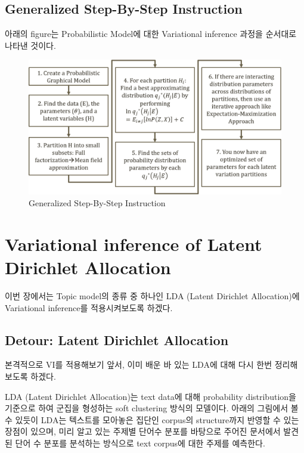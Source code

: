 \documentclass[draft=false]{oblivoir}
\begin{document}
\subsection{Generalized Step-By-Step Instruction}
아래의 figure는 Probabilistic Model에 대한 Variational inference 과정을 순서대로 나타낸 것이다. 

\begin{figure}[ht] \centering 
\includegraphics[scale=0.4]{fig11_9.png} 
\caption{Generalized Step-By-Step Instruction}
\label{fig:11-9}
\end{figure}

\section{Variational inference of Latent Dirichlet Allocation}
이번 장에서는 Topic model의 종류 중 하나인 LDA (Latent Dirichlet Allocation)에 Variational inference를 적용시켜보도록 하겠다. 

\subsection{Detour: Latent Dirichlet Allocation}
본격적으로 VI를 적용해보기 앞서, 이미 배운 바 있는 LDA에 대해 다시 한번 정리해보도록 하겠다. 

LDA (Latent Dirichlet Allocation)는 text data에 대해 probability distribution을 기준으로 하여 군집을 형성하는 soft clustering 방식의 모델이다. 
아래의 그림에서 볼 수 있듯이 LDA는 텍스트를 모아놓은 집단인 corpus의 structure까지 반영할 수 있는 장점이 있으며, 미리 알고 있는 주제별 단어수 분포를 바탕으로 주어진 문서에서 발견된 단어 수 분포를 분석하는 방식으로 text corpus에 대한 주제를 예측한다.
\end{document}
